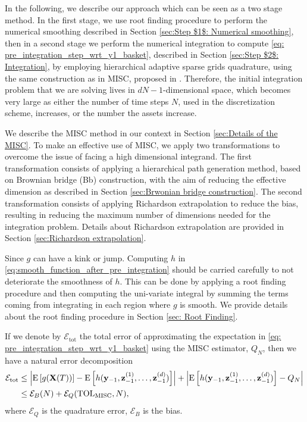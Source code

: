 In the following, we describe our approach which can be seen as a two stage method. In the first stage, we use root finding procedure to perform the numerical smoothing described in Section \ref{sec:Step $1$: Numerical smoothing}, then in a second stage we perform the numerical integration to compute \eqref{eq: pre_integration_step_wrt_y1_basket}, described in Section \ref{sec:Step $2$: Integration}, by employing hierarchical adaptive sparse grids  quadrature, using the same construction as in MISC, proposed in \cite{haji2016multi}. Therefore, the initial integration problem that we are solving lives in $dN-1$-dimensional space, which becomes very large as either the number of time steps $N$, used in the discretization  scheme, increases, or the number the assets increase. 

We describe the  MISC method in our context in Section \ref{sec:Details of the MISC}.  To make an effective use of MISC, we  apply two transformations to overcome the issue of facing a high dimensional integrand. The first transformation consists of applying a hierarchical  path generation method, based on Brownian bridge (Bb) construction, with the aim of reducing the effective dimension as  described  in Section \ref{sec:Brwonian bridge construction}. The second transformation consists of applying Richardson extrapolation to reduce the bias, resulting in reducing  the maximum number of dimensions needed for the integration problem. Details about  Richardson extrapolation  are provided in Section \ref{sec:Richardson extrapolation}.

Since $g$ can have a kink  or jump. Computing $h$ in \eqref{eq:smooth_function_after_pre_integration}  should be carried carefully to not deteriorate the smoothness of $h$. This can be done by applying a root finding procedure and then computing the uni-variate integral by summing the terms coming from integrating in each region where $g$ is smooth. We provide details about the root finding procedure in Section \ref{sec: Root Finding}.

If we denote by $\mathcal{E}_{\text{tot}}$ the total error of approximating the  expectation in \eqref{eq: pre_integration_step_wrt_y1_basket} using the MISC estimator, $Q_N$, then we have a natural error decomposition
\begin{align}\label{eq:total_error}
\mathcal{E}_{\text{tot}} & \le \left\lvert\mathrm{E}\left[g(\mathbf{X}(T))\right]- \mathrm{E}\left[h(\mathbf{y}_{-1}, \mathbf{z}^{(1)}_{-1},\dots,\mathbf{z}^{(d)}_{-1} )\right]\right\rvert+\left\lvert\mathrm{E}\left[h(\mathbf{y}_{-1}, \mathbf{z}^{(1)}_{-1},\dots,\mathbf{z}^{(d)}_{-1} )\right]-Q_{N}\right\rvert\nonumber\\
  & \le \mathcal{E}_B(N)+ \mathcal{E}_Q(\text{TOL}_{\text{MISC}},N),
\end{align}
where  $\mathcal{E}_Q$ is the quadrature error, $\mathcal{E}_B$  is the bias.

